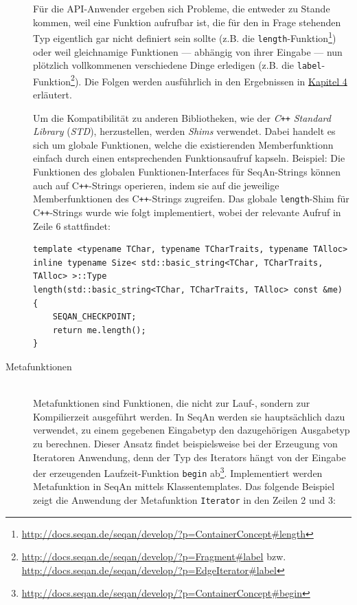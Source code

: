 \begin{description}
  Für die API-Anwender ergeben sich Probleme, die entweder zu Stande kommen, weil eine Funktion aufrufbar ist, die für den in Frage stehenden Typ eigentlich gar nicht definiert sein sollte (z.B. die \texttt{length}-Funktion\footnote{\url{http://docs.seqan.de/seqan/develop/?p=ContainerConcept\#length}}) oder weil gleichnamige Funktionen --- abhängig von ihrer Eingabe --- nun plötzlich vollkommenen verschiedene Dinge erledigen (z.B. die \texttt{label}-Funktion\footnote{\url{http://docs.seqan.de/seqan/develop/?p=Fragment\#label} bzw.\\\url{http://docs.seqan.de/seqan/develop/?p=EdgeIterator\#label}}). Die Folgen werden ausführlich in den Ergebnissen in \href{sec:gt}{Kapitel 4} erläutert.
  
  Um die Kompatibilität zu anderen Bibliotheken, wie der \textit{C{}}\verb!++! \textit{Standard Library} (\textit{STD}), herzustellen, werden \textit{Shims} verwendet. Dabei handelt es sich um globale Funktionen, welche die existierenden Memberfunktionn einfach durch einen entsprechenden Funktionsaufruf kapseln. Beispiel: Die Funktionen des globalen Funktionen-Interfaces für SeqAn-Strings können auch auf C{}\verb!++!-Strings operieren, indem sie auf die jeweilige Memberfunktionen des C{}\verb!++!-Strings zugreifen. Das globale \texttt{length}-Shim für C{}\verb!++!-Strings wurde wie folgt implementiert, wobei der relevante Aufruf in Zeile 6 stattfindet:

\begin{verbatim}
template <typename TChar, typename TCharTraits, typename TAlloc>
inline typename Size< std::basic_string<TChar, TCharTraits, TAlloc> >::Type
length(std::basic_string<TChar, TCharTraits, TAlloc> const &me)
{
    SEQAN_CHECKPOINT;
    return me.length();
}
\end{verbatim}
  
  \item[Metafunktionen] \hfill \\
  Metafunktionen sind Funktionen, die nicht zur Lauf-, sondern zur Kompilierzeit ausgeführt werden. In SeqAn werden sie hauptsächlich dazu verwendet, zu einem gegebenen Eingabetyp den dazugehörigen Ausgabetyp zu berechnen. Dieser Ansatz findet beispielsweise bei der Erzeugung von Iteratoren Anwendung, denn der Typ des Iterators hängt von der Eingabe der erzeugenden Laufzeit-Funktion \texttt{begin} ab\footnote{\url{http://docs.seqan.de/seqan/develop/?p=ContainerConcept\#begin}}. Implementiert werden Metafunktion in SeqAn mittels Klassentemplates. Das folgende Beispiel zeigt die Anwendung der Metafunktion \texttt{Iterator} in den Zeilen 2 und 3:


\end{description}
